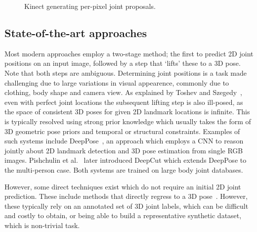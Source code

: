     \begin{figure}[H] %
        \caption{Kinect generating per-pixel joint proposals.}
        \label{fig:kinect_skeleton}
    \end{figure}

    \subsection{State-of-the-art approaches}
    Most modern approaches employ a two-stage method; the first to predict 2D joint positions on an input image, followed by a step that `lifts' these to a 3D pose. Note that both steps are ambiguous. Determining joint positions is a task made challenging due to large variations in visual appearence, commonly due to clothing, body shape and camera view. As explained by Toshev and Szegedy~\cite{toshev2014deeppose}, even with perfect joint locations the subsequent lifting step is also ill-posed, as the space of consistent 3D poses for given 2D landmark locations is infinite. This is typically resolved using strong prior knowledge which usually takes the form of 3D geometric pose priors and temporal or structural constraints. Examples of such systems include DeepPose~\cite{toshev2014deeppose}, an approach which employs a CNN to reason jointly about 2D landmark detection and 3D pose estimation from single RGB images. Pishchulin et al.~\cite{pishchulin2016deepcut} later introduced DeepCut which extends DeepPose to the multi-person case. Both systems are trained on large body joint databases. 

    However, some direct techniques exist which do not require an initial 2D joint prediction. These include methods that directly regress to a 3D pose~\cite{tekin2016direct}. However, these typically rely on an annotated set of 3D joint labels, which can be difficult and costly to obtain, or being able to build a representative synthetic dataset, which is non-trivial task.

